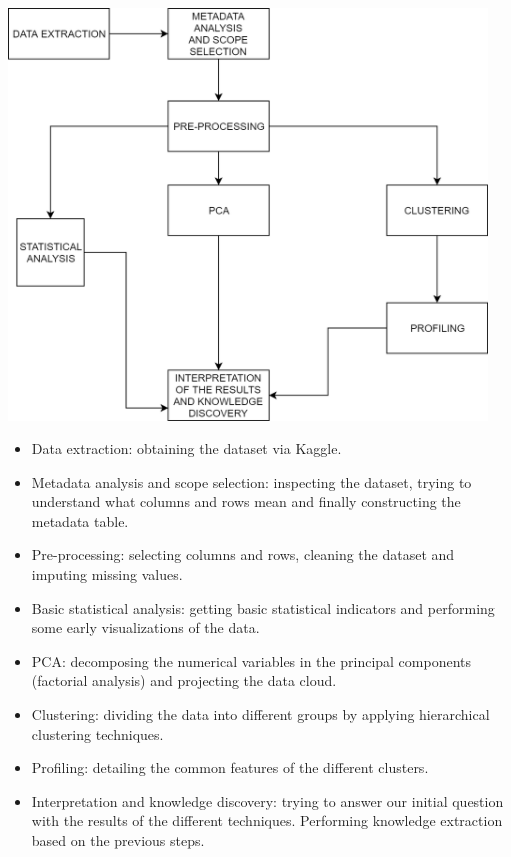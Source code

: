 
 
 
 \begin{center}
\includegraphics[width=5in]{images/data_process3.png}
\label{fig:aLabelForReferencing}
\end{center}

\begin{itemize}
    \item Data extraction: obtaining the dataset via Kaggle.
    \item Metadata analysis and scope selection: inspecting the dataset, trying to understand what columns and rows mean and finally constructing the metadata table.
    \item Pre-processing: selecting columns and rows, cleaning the dataset and imputing missing values.
    \item Basic statistical analysis: getting basic statistical indicators and performing some early visualizations of the data.
    \item PCA: decomposing the numerical variables in the principal components (factorial analysis) and projecting the data cloud.
    \item Clustering: dividing the data into different groups by applying hierarchical clustering techniques.
    \item Profiling: detailing the common features of the different clusters.
    \item Interpretation and knowledge discovery: trying to answer our initial question with the results of the different techniques. Performing knowledge extraction based on the previous steps.
\end{itemize}
 
